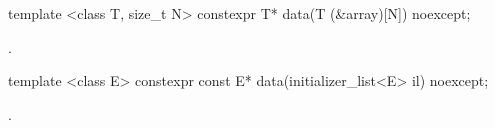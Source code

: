 \begin{itemdecl}
template <class T, size_t N> constexpr T* data(T (&array)[N]) noexcept;
\end{itemdecl}
\begin{itemdescr}
\pnum \returns {}.
\end{itemdescr}

\begin{itemdecl}
template <class E> constexpr const E* data(initializer_list<E> il) noexcept;
\end{itemdecl}
\begin{itemdescr}
\pnum \returns {}.
\end{itemdescr}
